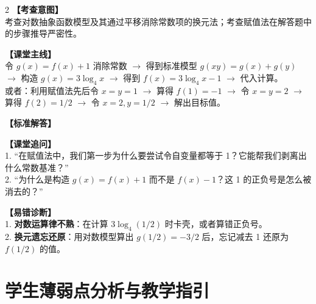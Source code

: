 \documentclass[12pt,a4paper]{ctexart}
\begin{document}
\begin{paracol}{2}
  \textbf{【考查意图】}\\
  考查对数抽象函数模型及其通过平移消除常数项的换元法；考查赋值法在解答题中的步骤推导严密性。
  
  \textbf{【课堂主线】}\\
  令 \(g(x)=f(x)+1\) 消除常数 \(\to\) 得到标准模型 \(g(xy)=g(x)+g(y)\) \(\to\) 构造 \(g(x)=3\log_4 x\) \(\to\) 得到 \(f(x)=3\log_4 x-1\) \(\to\) 代入计算。\\
  或者：利用赋值法先后令 \(x=y=1\) \(\to\) 算得 \(f(1)=-1\) \(\to\) 令 \(x=y=2\) \(\to\) 算得 \(f(2)=1/2\) \(\to\) 令 \(x=2, y=1/2\) \(\to\) 解出目标值。
  
  \textbf{【标准解答】}\\
  \qSevenSolution
  
  \textbf{【课堂追问】}\\
  1. “在赋值法中，我们第一步为什么要尝试令自变量都等于 1？它能帮我们剥离出什么常数基准？”\\
  2. “为什么是构造 \(g(x)=f(x)+1\) 而不是 \(f(x)-1\)？这 1 的正负号是怎么被消去的？”
  
  \switchcolumn
  \textbf{【易错诊断】}\\
  1. \textbf{对数运算律不熟}：在计算 \(3\log_4(1/2)\) 时卡壳，或者算错正负号。\\
  2. \textbf{换元遗忘还原}：用对数模型算出 \(g(1/2) = -3/2\) 后，忘记减去 1 还原为 \(f(1/2)\) 的值。
\end{paracol}

\vspace{0.8em}
\par{}
\vspace{0.8em}

\newpage

\section{学生薄弱点分析与教学指引}

\begingroup
\linespread{1.4}\selectfont
\end{document}
